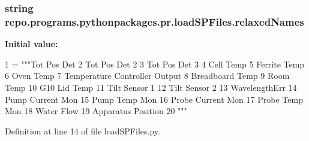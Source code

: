 \hypertarget{namespacerepo_1_1programs_1_1pythonpackages_1_1pr_1_1loadSPFiles_a92ba966a3b7423fd4d0c7874d3f92e71}{
\subsubsection[{relaxed\-Names}]{\setlength{\rightskip}{0pt plus 5cm}string repo.\-programs.\-pythonpackages.\-pr.\-load\-S\-P\-Files.\-relaxed\-Names}}\label{namespacerepo_1_1programs_1_1pythonpackages_1_1pr_1_1loadSPFiles_a92ba966a3b7423fd4d0c7874d3f92e71}
{\bfseries Initial value\-:}
\begin{DoxyCode}
1 = \textcolor{stringliteral}{"""Tot Pos Det}
2 \textcolor{stringliteral}{Tot Pos Det 2}
3 \textcolor{stringliteral}{Tot Pos Det 3}
4 \textcolor{stringliteral}{Cell Temp}
5 \textcolor{stringliteral}{Ferrite Temp}
6 \textcolor{stringliteral}{Oven Temp}
7 \textcolor{stringliteral}{Temperature Controller Output}
8 \textcolor{stringliteral}{Breadboard Temp}
9 \textcolor{stringliteral}{Room Temp}
10 \textcolor{stringliteral}{G10 Lid Temp}
11 \textcolor{stringliteral}{Tilt Sensor 1}
12 \textcolor{stringliteral}{Tilt Sensor 2}
13 \textcolor{stringliteral}{WavelengthErr}
14 \textcolor{stringliteral}{Pump Current Mon}
15 \textcolor{stringliteral}{Pump Temp Mon}
16 \textcolor{stringliteral}{Probe Current Mon}
17 \textcolor{stringliteral}{Probe Temp Mon}
18 \textcolor{stringliteral}{Water Flow}
19 \textcolor{stringliteral}{Apparatus Position}
20 \textcolor{stringliteral}{"""}
\end{DoxyCode}


Definition at line 14 of file load\-S\-P\-Files.\-py.

